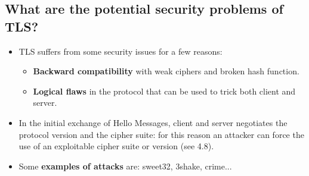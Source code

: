 \documentclass[9pt, letterpaper]{article}
\begin{document}
\subsection{What are the potential security problems of TLS?}
\begin{itemize}
	\item TLS suffers from some security issues for a few reasons:
	\begin{itemize}
		\item \textbf{Backward compatibility} with weak ciphers and broken hash function.
		\item \textbf{Logical flaws} in the protocol that can be used to trick both client and server.
	\end{itemize}
	\item In the initial exchange of Hello Messages, client and server negotiates the protocol version and the cipher suite: for this reason an attacker can force the use of an exploitable cipher suite or version (see 4.8).
	\item Some \textbf{examples of attacks} are: sweet32, 3shake, crime...
\end{itemize}
\end{document}
